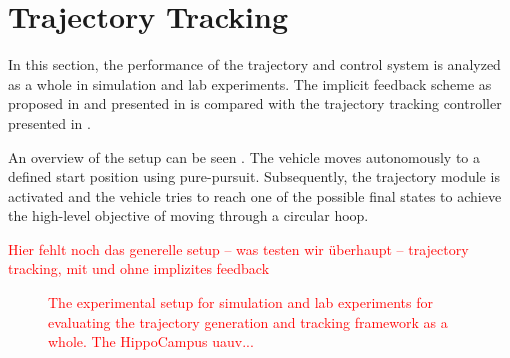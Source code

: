 


\section{Trajectory Tracking}

In this section, the performance of the trajectory and control system is analyzed as a whole in simulation and lab experiments.
The implicit feedback scheme as proposed in \cite{MuellerHehn15} and presented in  is compared with the trajectory tracking controller presented in .

An overview of the setup can be seen .
The vehicle moves autonomously to a defined start position using pure-pursuit.
Subsequently, the trajectory module is activated and the vehicle tries to reach one of the possible final states to achieve the high-level objective of moving through a circular hoop.

\textcolor{red}{Hier fehlt noch das generelle setup -- was testen wir überhaupt -- trajectory tracking, mit und ohne implizites feedback}


\begin{figure}
    \centering
    
    \caption{\textcolor{red}{The experimental setup for simulation and lab experiments for evaluating the trajectory generation and tracking framework as a whole. The HippoCampus \ac{uauv}...}}
    \label{fig:experimental_setup_drawing}
\end{figure}

